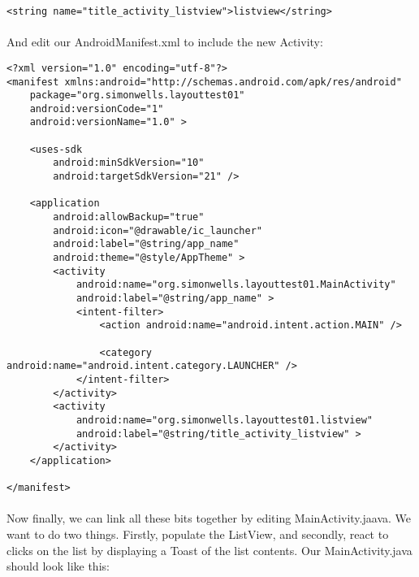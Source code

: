 \begin{lstlisting}
<string name="title_activity_listview">listview</string>
\end{lstlisting}

\paragraph{} And edit our AndroidManifest.xml to include the new Activity:

\begin{lstlisting}
<?xml version="1.0" encoding="utf-8"?>
<manifest xmlns:android="http://schemas.android.com/apk/res/android"
    package="org.simonwells.layouttest01"
    android:versionCode="1"
    android:versionName="1.0" >

    <uses-sdk
        android:minSdkVersion="10"
        android:targetSdkVersion="21" />

    <application
        android:allowBackup="true"
        android:icon="@drawable/ic_launcher"
        android:label="@string/app_name"
        android:theme="@style/AppTheme" >
        <activity
            android:name="org.simonwells.layouttest01.MainActivity"
            android:label="@string/app_name" >
            <intent-filter>
                <action android:name="android.intent.action.MAIN" />

                <category android:name="android.intent.category.LAUNCHER" />
            </intent-filter>
        </activity>
        <activity
            android:name="org.simonwells.layouttest01.listview"
            android:label="@string/title_activity_listview" >
        </activity>
    </application>

</manifest>
\end{lstlisting}

\paragraph{} Now finally, we can link all these bits together by editing MainActivity.jaava. We want to do two things. Firstly, populate the ListView, and secondly, react to clicks on the list by displaying a Toast of the list contents. Our MainActivity.java should look like this:

